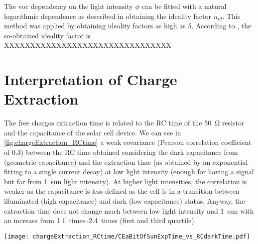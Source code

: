 The \gls{voc} dependency on the light intensity $\phi$ can be fitted with a natural logarithmic dependence as described in  obtaining the ideality factor $n_{id}$. This method was applied by  obtaining ideality factors as high as 5. According to , the so-obtained ideality factor is XXXXXXXXXXXXXXXXXXXXXXXXXXXXXXXX


\section{Interpretation of Charge Extraction}\label{interpretation_ce}
The free charges extraction time is related to the RC time of the \SI{50}{\ohm} resistor and the capacitance of the solar cell device. We can see in \cref{fig:chargeExtraction_RCtime} a weak covariance (Pearson correlation coefficient of 0.3) between the RC time obtained considering the dark capacitance from  (geometric capacitance) and the extraction time (as obtained by an exponential fitting to a single  current decay) at low light intensity (enough for having a signal but far from 1~sun light intensity). At higher light intensities, the correlation is weaker as the capacitance is less defined as the cell is in a transition between illuminated (high capacitance) and dark (low capacitance) status. Anyway, the extraction time does not change much between low light intensity and 1~sun with an increase from \SIrange{1.1}{2.4}{times} (first and third quartile).

\begin{SCfigure}%
	\centering
	\texttt{[image: chargeExtraction\_RCtime/CEaBitOfSunExpTime\_vs\_RCdarkTime.pdf]}
	\label{fig:chargeExtraction_RCtime}
\end{SCfigure}

